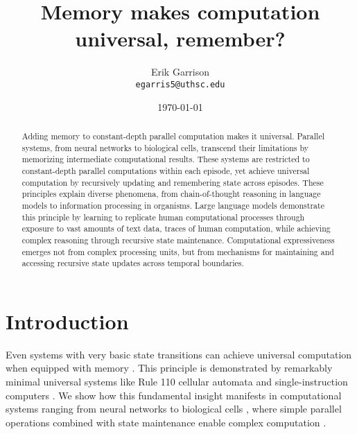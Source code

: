 \documentclass[12pt]{article}
\title{Memory makes computation universal, remember?}
\author{Erik Garrison\\
  \texttt{egarris5@uthsc.edu}\\[1ex]
  }
\date{\today}
\begin{document}
\maketitle

\begin{abstract}
Adding memory to constant-depth parallel computation makes it universal.
Parallel systems, from neural networks to biological cells, transcend their limitations by memorizing intermediate computational results.
These systems are restricted to constant-depth parallel computations within each episode, yet achieve universal computation by recursively updating and remembering state across episodes.
These principles explain diverse phenomena, from chain-of-thought reasoning in language models \cite{merrill2024} to information processing in organisms.
Large language models demonstrate this principle by learning to replicate human computational processes through exposure to vast amounts of text data, traces of human computation, while achieving complex reasoning through recursive state maintenance.
Computational expressiveness emerges not from complex processing units, but from mechanisms for maintaining and accessing recursive state updates across temporal boundaries.
\end{abstract}

\section{Introduction}
Even systems with very basic state transitions can achieve universal computation when equipped with memory \cite{merrill2023parallelism,peng2024limitations}. This principle is demonstrated by remarkably minimal universal systems like Rule 110 cellular automata \cite{cook2004universality} and single-instruction computers \cite{savage1994space}. We show how this fundamental insight manifests in computational systems ranging from neural networks to biological cells \cite{wang2023parallel}, where simple parallel operations combined with state maintenance enable complex computation \cite{swamy1983space,bisaz2024memory}.
\end{document}
